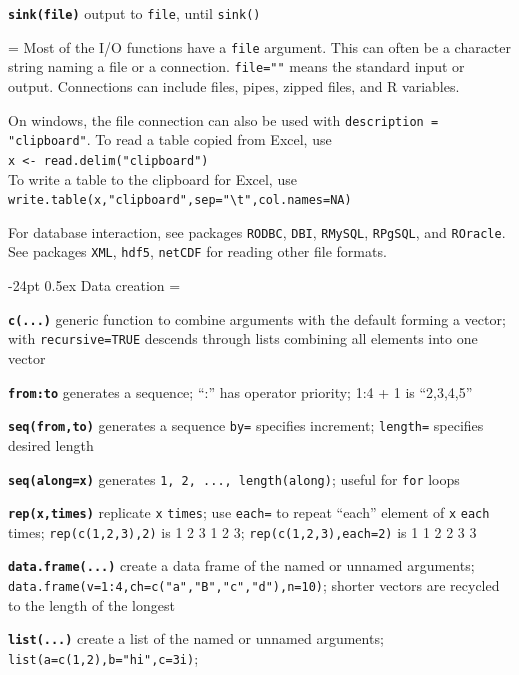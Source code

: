 \documentclass[10pt,landscape]{article}
\makeatletter
\renewcommand\section{\@startsection{section}{1}{0mm}%
                                     {-24pt}%
                                     {0.5ex}%
                                {\color{blue}\normalfont\large\bfseries}}
\newcommand{\code}{\texttt}
\newcommand{\bcode}[1]{\texttt{\textbf{#1}}}
\makeatother
\begin{document}
\begin{multicols}{3}
\bcode{sink(file)} output to \code{file}, until \code{sink()}

\everypar={\hangindent=0mm}
Most of the I/O functions have a \code{file} argument. This can often
be a character string naming a file or a connection.  \code{file=""} means the standard input or
output. Connections can include files, pipes, zipped
files, and R variables. 

On windows, the file connection can also be used with \code{description =
"clipboard"}. To read a table copied from Excel, use \\
\code{x <- read.delim("clipboard")}\\
To write a table to the clipboard for Excel, use \\
\code{write.table(x,"clipboard",sep="\textbackslash t",col.names=NA)}

For database interaction, see packages \code{RODBC}, \code{DBI},
\code{RMySQL}, \code{RPgSQL}, and \code{ROracle}. See packages \code{XML}, \code{hdf5}, \code{netCDF} for reading
other file formats.





\section{Data creation}
\everypar={\hangindent=9mm}

\bcode{c(...)} generic function to combine arguments with the default
forming a vector;
with \code{recursive=TRUE} descends through lists combining all elements
into one vector

\bcode{from:to} generates a sequence; ``:'' has operator priority; 1:4
+ 1 is ``2,3,4,5''

\bcode{seq(from,to)} generates a sequence
\code{by=} specifies increment; \code{length=} specifies desired length

\bcode{seq(along=x)} generates \code{1, 2, ..., length(along)}; useful for
\code{for} loops

\bcode{rep(x,times)} replicate \code{x} \code{times}; use \code{each=}
to repeat ``each'' element of \code{x} \code{each} times;
\code{rep(c(1,2,3),2)} is 1 2 3 1 2 3; \code{rep(c(1,2,3),each=2)} is 1 1 2 2 3 3 

\bcode{data.frame(...)} create a data frame of the named or unnamed arguments;
  \code{data.frame(v=1:4,ch=c("a","B","c","d"),n=10)}; shorter vectors
  are recycled to the length of the longest 

\bcode{list(...)} create a list of the named or unnamed arguments;
  \code{list(a=c(1,2),b="hi",c=3i)}; 


\end{multicols}
\end{document}
